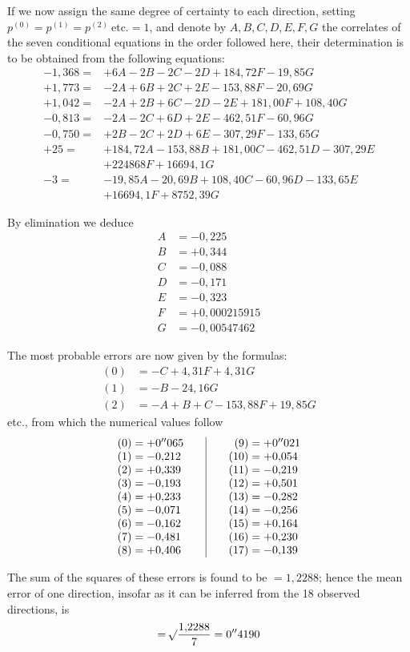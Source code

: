 If we now assign the same degree of certainty to each direction, setting \(p^{(0)}=p^{(1)}=p^{(2)}\ \text{etc.}=1\), and denote by \(A,B,C,D,E,F,G\) the correlates of the seven conditional equations in the order followed here, their determination is to be obtained from the following equations:
\[
\begin{aligned}
-1{,}368={}&+6A-2B-2C-2D+184{,}72F-19{,}85G\\
+1{,}773={}&-2A+6B+2C+2E-153{,}88F-20{,}69G\\
+1{,}042={}&-2A+2B+6C-2D-2E+181{,}00F+108{,}40G\\
-0{,}813={}&-2A-2C+6D+2E-462{,}51F-60{,}96G\\
-0{,}750={}&+2B-2C+2D+6E-307{,}29F-133{,}65G\\
+25={}&+184{,}72A-153{,}88B+181{,}00C-462{,}51D-307{,}29E\\
&+224868F+16694{,}1G\\
-3={}&-19{,}85A-20{,}69B+108{,}40C-60{,}96D-133{,}65E\\
&+16694{,}1F+8752{,}39G
\end{aligned}
\]

By elimination we deduce
\[
\begin{aligned}
A&=-0{,}225\\
B&=+0{,}344\\
C&=-0{,}088\\
D&=-0{,}171\\
E&=-0{,}323\\
F&=+0{,}000215915\\
G&=-0{,}00547462
\end{aligned}
\]

The most probable errors are now given by the formulas:
\[
\begin{aligned}
(0)&=-C+4{,}31F+4{,}31G\\
(1)&=-B-24{,}16G\\
(2)&=-A+B+C-153{,}88F+19{,}85G
\end{aligned}
\]
etc., from which the numerical values follow
\[
\begin{array}{r@{\;}l@{\qquad}|@{\qquad}r@{\;}l}
(0)=&+0''065&(9)=&+0''021\\
(1)=&-0{,}212&(10)=&+0{,}054\\
(2)=&+0{,}339&(11)=&-0{,}219\\
(3)=&-0{,}193&(12)=&+0{,}501\\
(4)=&+0{,}233&(13)=&-0{,}282\\
(5)=&-0{,}071&(14)=&-0{,}256\\
(6)=&-0{,}162&(15)=&+0{,}164\\
(7)=&-0{,}481&(16)=&+0{,}230\\
(8)=&+0{,}406&(17)=&-0{,}139
\end{array}
\]

The sum of the squares of these errors is found to be \(=1{,}2288\); hence the mean error of one direction, insofar as it can be inferred from the 18 observed directions, is
\[
=\mathord{{}^{}\!\surd}\frac{1{,}2288}{7}=0''4190
\]

